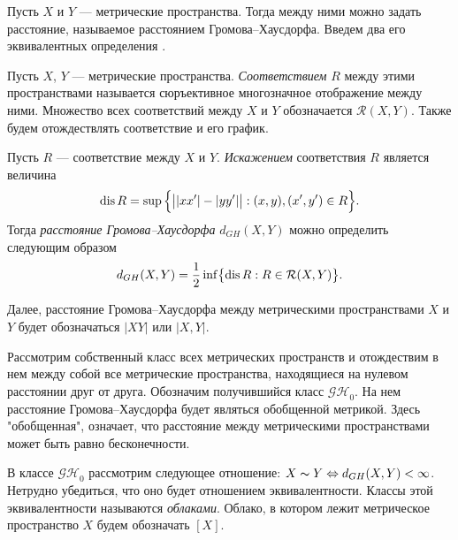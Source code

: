 Пусть $X$ и $Y$ ---
метрические пространства. Тогда между ними можно задать расстояние, называемое
расстоянием Громова--Хаусдорфа. Введем два его эквивалентных
определения \cite{Lectures}.
\begin{defin}
  Пусть $X$, $Y$ --- метрические пространства. \emph{Соответствием}
  $R$ между этими пространствами
  называется сюръективное многозначное отображение между ними.
  Множество всех соответствий между $X$ и $Y$ обозначается
  $\mathcal{R}(X,Y)$. Также будем отождествлять соответствие и его график.
\end{defin}
\begin{defin}
  Пусть $R$ --- соответствие между $X$ и $Y$.
  \emph{Искажением} соответствия $R$ является величина
  $$ \operatorname{dis}{R} = \sup{\Bigl\{ \big| |xx'| - |yy'| \big| : (x, y), (x',
  y') \in R\Bigr\}}.$$
  Тогда \emph{расстояние Громова--Хаусдорфа} $d_{GH}(X,Y)$ можно определить
  следующим образом
  $$ d_{GH}(X,Y) = \frac{1}{2}\inf \bigl\{\operatorname{dis}{R} : R \in
  \mathcal{R}(X,Y)\bigr\}.$$
  \label{defSootvet}
\end{defin}

Далее, расстояние Громова--Хаусдорфа между метрическими
пространствами $X$ и $Y$ будет обозначаться $|XY|$ или \( | X,Y | \).

Рассмотрим собственный класс всех метрических пространств и
отождествим в нем между собой все метрические пространства,
находящиеся на нулевом расстоянии друг от друга. Обозначим
получившийся класс $\mathcal{GH}_0$.  На нем расстояние
Громова--Хаусдорфа будет являться обобщенной метрикой. Здесь "обобщенная", означает, что расстояние между метрическими пространствами может быть равно бесконечности.
\begin{defin} В классе $\mathcal{GH}_{0}$ рассмотрим следующее
  отношение: $X \thicksim Y \Leftrightarrow d_{GH}(X, Y) < \infty$. Нетрудно
  убедиться, что оно будет отношением эквивалентности. Классы этой
  эквивалентности
  называются \emph{облаками}. Облако, в котором лежит метрическое
  пространство $X$
  будем обозначать $[X]$.
\end{defin}

